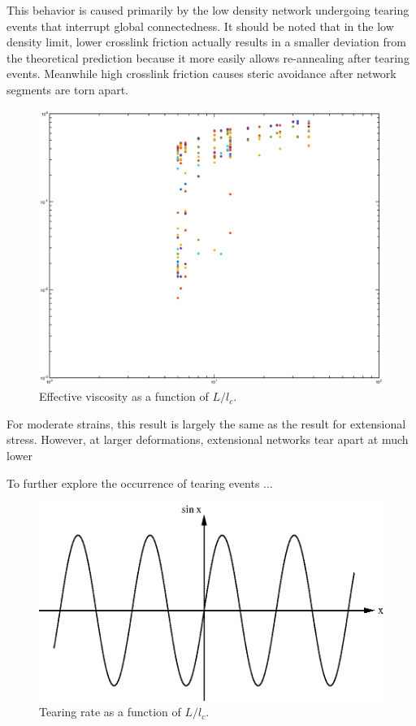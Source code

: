 \documentclass[prb,11pt]{revtex4-1}
\begin{document}
This behavior is caused primarily by the low density network undergoing tearing events that interrupt global connectedness.  It should be noted that in the low density limit, lower crosslink friction actually results in a smaller deviation from the theoretical prediction because it more easily allows re-annealing after tearing events.  Meanwhile high crosslink friction causes steric avoidance after network segments are torn apart.

\begin{figure}[h!]
\centering
\includegraphics[width=\textwidth]{eff_vic}
\caption{\label{fig:effvic}Effective viscosity as a function of $L/l_c$.}
\end{figure}

For moderate strains, this result is largely the same as the result for extensional stress.  However, at larger deformations, extensional networks tear apart at much lower

To further explore the occurrence of tearing events ...

\begin{figure}[h!]
\centering
\includegraphics[scale=0.6]{sine}
\caption{\label{fig:tear}Tearing rate as a function of $L/l_c$.}
\end{figure}
\end{document}
